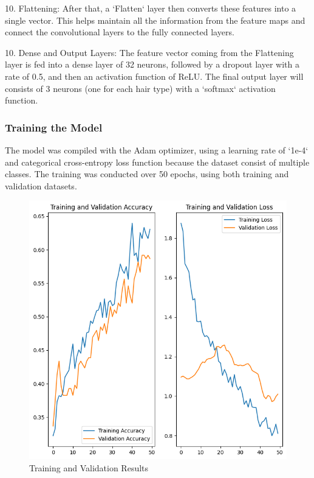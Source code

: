 10. Flattening: After that, a `Flatten` layer then converts these features into a single vector. This helps maintain all the information from the feature maps and connect the convolutional layers to the fully connected layers.

10. Dense and Output Layers: The feature vector coming from the Flattening layer is fed into a dense layer of 32 neurons, followed by a dropout layer with a rate of 0.5, and then an activation function of ReLU. The final output layer will consists of 3 neurons (one for each hair type) with a `softmax` activation function.

\subsubsection{Training the Model}

The model was compiled with the Adam optimizer, using a learning rate of `1e-4` and categorical cross-entropy loss function because the dataset consist of multiple classes. The training was conducted over 50 epochs, using both training and validation datasets.

\begin{figure}[H]
  \includegraphics[width=\linewidth]{figures/training_validation_results.png}
  \caption{Training and Validation Results}
  \label{fig:results}
\end{figure}


